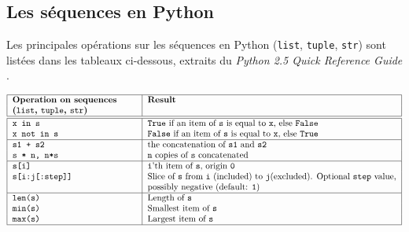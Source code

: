 \subsection{Les séquences en {\sc Python}}\label{python:listes}
Les principales opérations sur les séquences en {\sc Python} ({\tt list}, 
{\tt tuple}, {\tt str}) sont listées dans les tableaux ci-dessous, extraits 
du {\em {\sc Python} 2.5 Quick Reference Guide} \cite{gruet}.

$$\label{tab:sequences}\begin{tabular}{|p{5cm}|p{10cm}|}
\hline
\bf Operation on sequences &	\bf Result\\
\bf ({\tt list}, {\tt tuple}, {\tt str}) & \\
\hline
\hline
\tt x in s 		& {\tt True} if an item of {\tt s} is equal to {\tt x}, else {\tt False} \\	
\tt x not in s 		& {\tt False} if an item of {\tt s} is equal to {\tt x}, else {\tt True} \\	
\hline
\tt s1 + s2 		& the concatenation of {\tt s1} and {\tt s2} \\	 
\tt s * n, n*s 		& {\tt n} copies of {\tt s} concatenated \\	
\hline
\tt s[i] 		& {\tt i}'th item of {\tt s}, origin {\tt 0} \\	
\tt s[i:j[:step]]	& Slice of {\tt s} from {\tt i} (included) to {\tt j}(excluded). 
		  	  Optional {\tt step} value, possibly negative (default: {\tt 1}) \\ 	
\hline
\tt len(s) 		& Length of {\tt s} \\ 
\tt min(s) 		& Smallest item of {\tt s} \\
\tt max(s) 		& Largest item of {\tt s} \\
\hline
\end{tabular}$$ 

